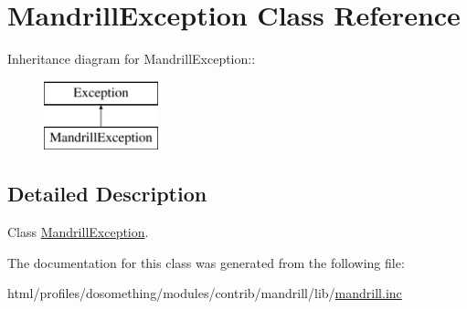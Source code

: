 \hypertarget{classMandrillException}{
\section{MandrillException Class Reference}
\label{classMandrillException}
}
Inheritance diagram for MandrillException::\begin{figure}[H]
\begin{center}
\leavevmode
\includegraphics[height=2cm]{classMandrillException}
\end{center}
\end{figure}


\subsection{Detailed Description}
Class \hyperlink{classMandrillException}{MandrillException}. 

The documentation for this class was generated from the following file:\begin{DoxyCompactItemize}
\item 
html/profiles/dosomething/modules/contrib/mandrill/lib/\hyperlink{mandrill_8inc}{mandrill.inc}\end{DoxyCompactItemize}
